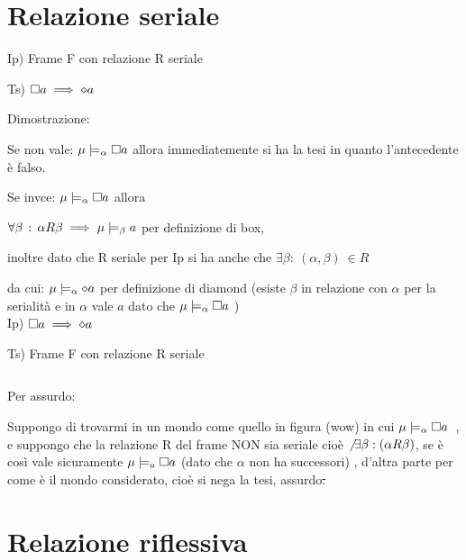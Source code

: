 \section{Relazione seriale}

Ip) Frame F con relazione R seriale

Ts) $\square a\implies\diamond a$

Dimostrazione:

Se non vale: $\mu\models_{\alpha}\square a$ allora immediatemente si
ha la tesi in quanto l'antecedente è falso.

Se invce: $\mu\models_{\alpha}\square a$ allora

$\forall\beta\,:\,\alpha R\beta\implies\mu\models_{\beta}a$ per definizione
di box,

inoltre dato che R seriale per Ip si ha anche che $\exists\beta:\:(\alpha,\beta)\:\in R$

da cui: $\mu\models_{\alpha}\diamond a$ per definizione di diamond (esiste
$\beta$ in relazione con $\alpha$ per la serialità e in $\alpha$
vale $a$ dato che $\mu\models_{\alpha}\square a$ )\\


Ip) $\square a\implies\diamond a$

Ts) Frame F con relazione R seriale

\begin{center}
$ $\begin{center}  
 \end{center}
\par\end{center}

Per assurdo:

Suppongo di trovarmi in un mondo come quello in figura (wow) in cui
\mbox{$\mu\models_{\alpha}\square a$ }, e suppongo che la relazione
R del frame NON sia seriale cioè $\not\,\exists\beta:(\alpha R\beta)$,
se è così vale sicuramente $\mu\models_{a}\square a$ (dato che $\alpha$
non ha successori) , d'altra parte per come è il mondo considerato,
cioè si nega la tesi, assurdo\sout{.}


\section{Relazione riflessiva}

